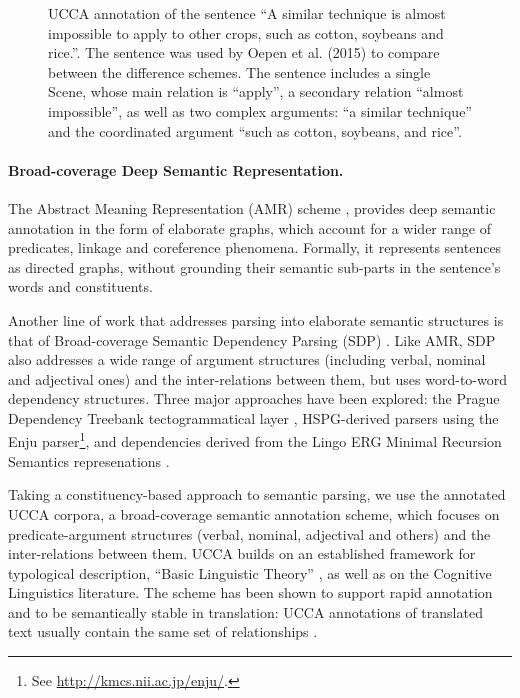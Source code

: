\documentclass[11pt]{article}
\begin{document}
\begin{figure*}
\begin{adjustbox}{width=\textwidth}
\end{adjustbox}
\caption{\label{fig:ucca_example}
  UCCA annotation of the sentence ``A similar technique is almost impossible to
  apply to other crops, such as cotton, soybeans and rice.''.
  The sentence was used by Oepen et al. (2015) to compare between the difference schemes. The sentence includes a single Scene, whose main relation is ``apply'', a secondary relation ``almost impossible'', as well as two complex arguments: ``a similar technique'' and the coordinated argument ``such as cotton, soybeans, and rice''.
}
\end{figure*}

\paragraph{Broad-coverage Deep Semantic Representation.}
The Abstract Meaning Representation (AMR) scheme \cite{banarescu2013abstract},
provides deep semantic annotation in the form of elaborate graphs,
which account for a wider range of predicates, linkage and coreference phenomena.
Formally, it represents sentences as directed graphs, without grounding their
semantic sub-parts in the sentence's words and constituents.

Another line of work that addresses parsing into elaborate semantic structures
is that of Broad-coverage Semantic Dependency Parsing (SDP) \cite{oepen2014semeval,oepen2015semeval}.
Like AMR, SDP also addresses a wide range of argument structures (including verbal, nominal and
adjectival ones) and the inter-relations between them, but uses word-to-word dependency structures.
Three major approaches have been explored:
the Prague Dependency Treebank tectogrammatical layer \cite{bohmova2003prague},
HSPG-derived parsers using the Enju parser\footnote{See \url{http://kmcs.nii.ac.jp/enju/}.},
and dependencies derived from the Lingo ERG Minimal Recursion Semantics represenations \cite{Flic:02}.

Taking a constituency-based approach to semantic parsing,
we use the annotated UCCA corpora, a broad-coverage semantic annotation scheme,
which focuses on predicate-argument structures (verbal, nominal, adjectival and others)
and the inter-relations between them. UCCA \cite{abend2013universal} builds on an established
framework for typological description, ``Basic Linguistic Theory''
\cite{Dixon:10b,Dixon:10a,Dixon:12}, as well as on the Cognitive Linguistics literature. The scheme
has been shown to support rapid annotation and to be semantically stable in translation: UCCA
annotations of translated text usually contain the same set of relationships
\cite{sulem2015conceptual}.
\end{document}
